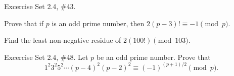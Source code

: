 \documentclass[12pt]{exam}
\begin{document}
\begin{questions}
\newpage 
\question  Excercise Set 2.4, \#43.
\begin{parts}
\item Prove that if $p$ is an odd prime number, then $2(p-3)! \equiv -1 \pmod{p}$.
\item Find the least non-negative residue of $2(100!) \pmod{103}$.
\end{parts}

\newpage 
\question  Excercise Set 2.4, \#48.
Let $p$ be an odd prime number. Prove that 
\begin{equation*}
1^2 3^2 5^2 \cdots (p-4)^2 (p-2)^2 \equiv (-1)^{(p+1)/2} \pmod{p}.
\end{equation*}


 

 

\end{questions}
\end{document}
